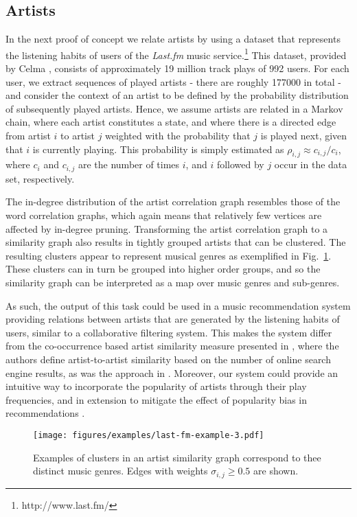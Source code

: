 \documentclass{sig-alternate}
\newcommand{\rn}[1]{\rho_{#1}}
\newcommand{\sy}[1]{\sigma_{#1}}
\begin{document}
\subsection{Artists}
In the next proof of concept we relate artists by using a dataset that represents the listening
habits of users of the \emph{Last.fm} music service.\footnote{http://www.last.fm/} This dataset, provided by Celma
\cite{Celma2010}, consists of approximately 19 million track plays of 992 users. For each user, we extract sequences of
played artists - there are roughly 177000 in total - and consider the context of an artist to be defined by the probability
distribution of subsequently played artists. Hence, we assume artists are related in a Markov chain, where each artist
constitutes a state, and where there is a directed edge from artist $i$ to artist $j$ weighted with the probability
that $j$ is played next, given that $i$ is currently playing. This probability is simply estimated as $\rn{i,j} \approx
c_{i,j}/c_i$, where $c_i$ and $c_{i,j}$ are the number of times $i$, and $i$ followed by $j$ occur in the data set,
respectively.

The in-degree distribution of the artist correlation graph resembles those of the word correlation graphs,
which again means that relatively few vertices are affected by in-degree pruning. Transforming the artist correlation
graph to a similarity graph also results in tightly grouped artists that can be clustered. The resulting
clusters appear to represent musical genres as exemplified in Fig.\ \ref{fig:artists}. These clusters can in turn be grouped
into higher order groups, and so the similarity graph can be interpreted as a map over music genres and sub-genres.

As such, the output of this task could be used in a music recommendation system providing relations between artists that
are generated by the listening habits of users, similar to a collaborative filtering system. This makes the system differ
from the co-occurrence based artist similarity measure presented in \cite{schedl2005web}, where the authors define
artist-to-artist similarity based on the number of online search engine results, as was the approach
in \cite{Cilibrasi-2007}. Moreover, our system could provide an intuitive way to incorporate the popularity of artists through
their play frequencies, and in extension to mitigate the effect of popularity bias in recommendations \cite{celma2008hits}.

\begin{figure}
\begin{centering}
\texttt{[image: figures/examples/last-fm-example-3.pdf]}
\end{centering}
\caption{Examples of clusters in an artist similarity graph correspond to thee distinct music genres. Edges with weights $\sy{i,j} \geq 0.5$ are shown.}
\label{fig:artists}
\end{figure}
\end{document}
